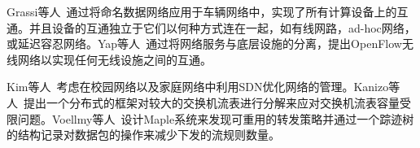 \documentclass{ctexart}
\begin{document}

Grassi等人~\cite{grassi2014vanet}通过将命名数据网络应用于车辆网络中，实现了所有计算设备上的互通。并且设备的互通独立于它们以何种方式连在一起，如有线网路，ad-hoc网络，或延迟容忍网络。Yap等人~\cite{yap2010blueprint}通过将网络服务与底层设施的分离，提出OpenFlow无线网络以实现任何无线设施之间的互通。


Kim等人~\cite{kim2013improving}考虑在校园网络以及家庭网络中利用SDN优化网络的管理。Kanizo等人~\cite{kanizo2013palette}提出一个分布式的框架对较大的交换机流表进行分解来应对交换机流表容量受限问题。Voellmy等人~\cite{voellmy2013maple}设计Maple系统来发现可重用的转发策略并通过一个踪迹树的结构记录对数据包的操作来减少下发的流规则数量。

\end{document}
